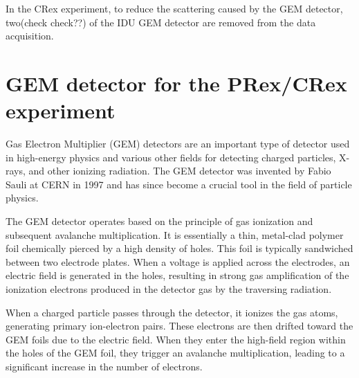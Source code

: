 In the CRex experiment, to reduce the scattering caused by the GEM detector, two(check check??) of the IDU GEM detector are removed from the data acquisition. 


\section{GEM detector for the PRex/CRex experiment}

Gas Electron Multiplier (GEM) detectors are an important type of detector used in high-energy physics and various other fields for detecting charged particles, X-rays, and other ionizing radiation. The GEM detector was invented by Fabio Sauli at CERN in 1997 and has since become a crucial tool in the field of particle physics.

The GEM detector operates based on the principle of gas ionization and subsequent avalanche multiplication. It is essentially a thin, metal-clad polymer foil chemically pierced by a high density of holes. This foil is typically sandwiched between two electrode plates. When a voltage is applied across the electrodes, an electric field is generated in the holes, resulting in strong gas amplification of the ionization electrons produced in the detector gas by the traversing radiation.

When a charged particle passes through the detector, it ionizes the gas atoms, generating primary ion-electron pairs. These electrons are then drifted toward the GEM foils due to the electric field. When they enter the high-field region within the holes of the GEM foil, they trigger an avalanche multiplication, leading to a significant increase in the number of electrons.

